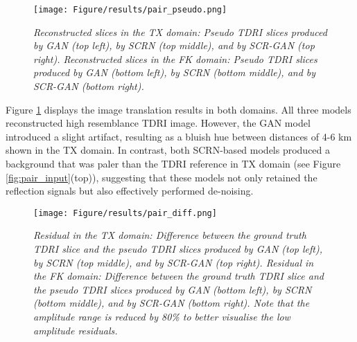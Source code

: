 \begin{figure}[ht]
	\centering
	\texttt{[image: Figure/results/pair\_pseudo.png]} %
	\caption{\textit{Reconstructed slices in the TX domain: Pseudo TDRI slices produced by GAN (top left), by SCRN (top middle), and by SCR-GAN (top right). Reconstructed slices in the FK domain: Pseudo TDRI slices produced by GAN (bottom left), by SCRN (bottom middle), and by SCR-GAN (bottom right).}}
	\label{fig:pair_output}
\end{figure}

\noindent Figure \ref{fig:pair_output} displays the image translation results in both domains. All three models reconstructed high resemblance TDRI image. However, the GAN model introduced a slight artifact, resulting as a bluish hue between distances of 4-6 km shown in the TX domain. In contrast, both SCRN-based models produced a background that was paler than the TDRI reference in TX domain (see Figure \ref{fig:pair_input}(top)), suggesting that these models not only retained the reflection signals but also effectively performed de-noising.\\

\begin{figure}[ht]
	\centering
	\texttt{[image: Figure/results/pair\_diff.png]} %
	\caption{\textit{Residual in the TX domain: Difference between the ground truth TDRI slice and the pseudo TDRI slices produced by GAN (top left), by SCRN (top middle), and by SCR-GAN (top right). Residual in the FK domain: Difference between the ground truth TDRI slice and the pseudo TDRI slices produced by GAN (bottom left), by SCRN (bottom middle), and by SCR-GAN (bottom right). Note that the amplitude range is reduced by 80\% to better visualise the low amplitude residuals.}}
	\label{fig:pair_diff}
\end{figure}

